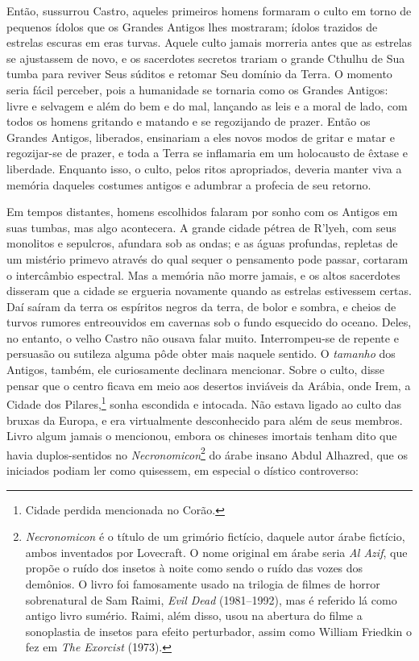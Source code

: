 Então, sussurrou Castro, aqueles primeiros homens formaram o culto em
torno de pequenos ídolos que os Grandes Antigos lhes mostraram; ídolos
trazidos de estrelas escuras em eras turvas. Aquele culto jamais
morreria antes que as estrelas se ajustassem de novo, e os sacerdotes
secretos trariam o grande Cthulhu de Sua tumba para reviver Seus súditos
e retomar Seu domínio da Terra. O momento seria fácil perceber, pois a
humanidade se tornaria como os Grandes Antigos: livre e selvagem e além
do bem e do mal, lançando as leis e a moral de lado, com todos os homens
gritando e matando e se regozijando de prazer. Então os Grandes Antigos,
liberados, ensinariam a eles novos modos de gritar e matar e
regozijar-se de prazer, e toda a Terra se inflamaria em um holocausto de
êxtase e liberdade. Enquanto isso, o culto, pelos ritos apropriados,
deveria manter viva a memória daqueles costumes antigos e adumbrar a
profecia de seu retorno.

Em tempos distantes, homens escolhidos falaram por sonho com os Antigos
em suas tumbas, mas algo acontecera. A grande cidade pétrea de R'lyeh,
com seus monolitos e sepulcros, afundara sob as ondas; e as águas
profundas, repletas de um mistério primevo através do qual sequer o
pensamento pode passar, cortaram o intercâmbio espectral. Mas a memória
não morre jamais, e os altos sacerdotes disseram que a cidade se
ergueria novamente quando as estrelas estivessem certas. Daí saíram da
terra os espíritos negros da terra, de bolor e sombra, e cheios de
turvos rumores entreouvidos em cavernas sob o fundo esquecido do oceano.
Deles, no entanto, o velho Castro não ousava falar muito. Interrompeu-se
de repente e persuasão ou sutileza alguma pôde obter mais naquele
sentido. O \emph{tamanho} dos Antigos, também, ele curiosamente
declinara mencionar. Sobre o culto, disse pensar que o centro ficava em
meio aos desertos inviáveis da Arábia, onde Irem, a Cidade dos
Pilares,\footnote{Cidade perdida mencionada no Corão.} sonha escondida e
intocada. Não estava ligado ao culto das bruxas da Europa, e era
virtualmente desconhecido para além de seus membros. Livro algum jamais
o mencionou, embora os chineses imortais tenham dito que havia
duplos-sentidos no \emph{Necronomicon}\footnote{\emph{Necronomicon} é o
  título de um grimório fictício, daquele autor árabe fictício, ambos
  inventados por Lovecraft. O nome original em árabe seria \emph{Al
  Azif}, que propõe o ruído dos insetos à noite como sendo o ruído das
  vozes dos demônios. O livro foi famosamente usado na trilogia de
  filmes de horror sobrenatural de Sam Raimi, \emph{Evil Dead}
  (1981--1992), mas é referido lá como antigo livro sumério. Raimi, além
  disso, usou na abertura do filme a sonoplastia de insetos para efeito
  perturbador, assim como William Friedkin o fez em \emph{The Exorcist}
  (1973).} do árabe insano Abdul Alhazred, que os iniciados podiam ler
como quisessem, em especial o dístico controverso:

